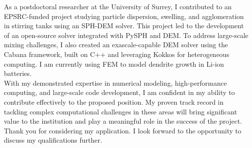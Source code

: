 \documentclass[11pt,a4paper,roman]{moderncv}
\begin{document}
\vspace{1em}
As a postdoctoral researcher at the University of Surrey, I
contributed to an EPSRC-funded project studying particle dispersion,
swelling, and agglomeration in stirring tanks using an SPH-DEM
solver. This project led to the development of an open-source solver
integrated with PySPH and DEM. To address large-scale mixing
challenges, I also created an exascale-capable DEM solver using the
Cabana framework, built on C++ and leveraging Kokkos for heterogeneous
computing. I am currently using FEM to model dendrite growth in Li-ion batteries.\\


\vspace{1em}
With my demonstrated expertise in numerical modeling, high-performance
computing, and large-scale code development, I am confident in my
ability to contribute effectively to the proposed position. My proven
track record in tackling complex computational challenges in these
areas will bring significant value to the institution and play a
meaningful role in the success of the project.\\



\vspace{1em}
Thank you for considering my application. I look forward to the
opportunity to discuss my qualifications further.\\



\vspace{0.5cm}


\makeletterclosing
\end{document}
